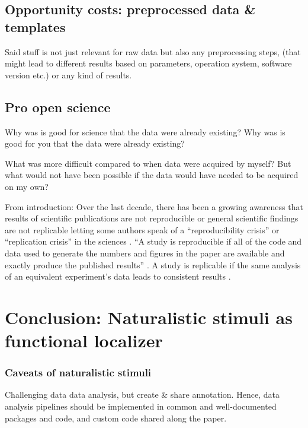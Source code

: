 \subsection{Opportunity costs: preprocessed data \& templates}
%
Said stuff is not just relevant for raw data but also any preprocessing steps,
(that might lead to different results based on parameters, operation system,
software version etc.) or any kind of results.


\subsection{Pro open science}

%
Why was is good for science that the data were already existing?
%
Why was is good for you that the data were already existing?

%
What was more difficult compared to when data were acquired by myself?
%
But what would not have been possible if the data would have needed to be
acquired on my own?

From introduction:
Over the last decade, there has been a growing awareness that results of
scientific publications are not reproducible or general scientific findings are
not replicable letting some authors speak of a ``reproducibility crisis'' or
``replication crisis'' in the sciences \citep{baker2016reproducibility,
plesser2018reproducibility, stupple2019reproducibility, nosek2022replicability}.
``A study is reproducible if all of the code and data used to generate the
numbers and figures in the paper are available and exactly produce the published
results'' \citep{leek2017most}.
A study is replicable if the same analysis of an equivalent experiment's data
leads to consistent results \citep{dubois2016building, leek2017most}.


\section{Conclusion: Naturalistic stimuli as functional localizer}

\subsubsection{Caveats of naturalistic stimuli}
%
Challenging data data analysis, but create \& share annotation.
%
Hence, data analysis pipelines should be implemented in common and
well-documented packages and code, and custom code shared along the paper.

